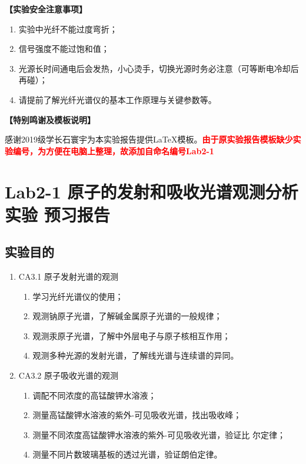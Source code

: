 \documentclass[dvipsnames, svgnames,a4paper,11pt]{article}
\begin{document}
	\textbf{【实验安全注意事项】}	
	\begin{enumerate}
		\item 实验中光纤不能过度弯折；
		\item 信号强度不能过饱和值；
		\item 光源长时间通电后会发热，小心烫手，切换光源时务必注意（可等断电冷却后再碰）；
		\item 请提前了解光纤光谱仪的基本工作原理与关键参数等。		
	\end{enumerate}
	
	
	\textbf{【特别鸣谢及模板说明】}	
	
	感谢2019级学长石寰宇为本实验报告提供\LaTeX 模板。\textcolor{red}{\textbf{由于原实验报告模板缺少实验编号，为方便在电脑上整理，故添加自命名编号Lab2-1}}
	
	
	
	\clearpage
	\tableofcontents
	\clearpage
	
	
	
	
	\setcounter{section}{0}
	\section{Lab2-1 原子的发射和吸收光谱观测分析实验 \quad\heiti 预习报告}
	
	\subsection{实验目的}
	\begin{enumerate}
		\item CA3.1 原子发射光谱的观测
		\begin{enumerate}
			\item 学习光纤光谱仪的使用；
			\item 观测钠原子光谱，了解碱金属原子光谱的一般规律；
			\item 观测汞原子光谱，了解中外层电子与原子核相互作用；
			\item 观测多种光源的发射光谱，了解线光谱与连续谱的异同。
		\end{enumerate}
		
		\item CA3.2 原子吸收光谱的观测
		\begin{enumerate}
			\item 调配不同浓度的高锰酸钾水溶液；
			\item 测量高锰酸钾水溶液的紫外-可见吸收光谱，找出吸收峰；
			\item 测量不同浓度高锰酸钾水溶液的紫外-可见吸收光谱，验证比
			尔定律；
			\item 测量不同片数玻璃基板的透过光谱，验证朗伯定律。
		\end{enumerate}
	\end{enumerate}
	
\end{document}
